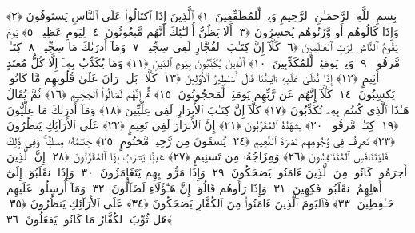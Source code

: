 
  
    
  
    
    

\nopagebreak
  بِسمِ ٱللَّهِ ٱلرَّحمَـٰنِ ٱلرَّحِيمِ
  وَيلٌۭ لِّلمُطَفِّفِينَ ﴿١﴾
 ٱلَّذِينَ إِذَا ٱكتَالُوا۟ عَلَى ٱلنَّاسِ يَستَوفُونَ ﴿٢﴾
 وَإِذَا كَالُوهُم أَو وَّزَنُوهُم يُخسِرُونَ ﴿٣﴾
 أَلَا يَظُنُّ أُو۟لَـٰٓئِكَ أَنَّهُم مَّبعُوثُونَ ﴿٤﴾
 لِيَومٍ عَظِيمٍۢ ﴿٥﴾
 يَومَ يَقُومُ ٱلنَّاسُ لِرَبِّ ٱلعَـٰلَمِينَ ﴿٦﴾
 كَلَّآ إِنَّ كِتَـٰبَ ٱلفُجَّارِ لَفِى سِجِّينٍۢ ﴿٧﴾
 وَمَآ أَدرَىٰكَ مَا سِجِّينٌۭ ﴿٨﴾
 كِتَـٰبٌۭ مَّرقُومٌۭ ﴿٩﴾
 وَيلٌۭ يَومَئِذٍۢ لِّلمُكَذِّبِينَ ﴿١٠﴾
 ٱلَّذِينَ يُكَذِّبُونَ بِيَومِ ٱلدِّينِ ﴿١١﴾
 وَمَا يُكَذِّبُ بِهِۦٓ إِلَّا كُلُّ مُعتَدٍ أَثِيمٍ ﴿١٢﴾
 إِذَا تُتلَىٰ عَلَيهِ ءَايَـٰتُنَا قَالَ أَسَـٰطِيرُ ٱلأَوَّلِينَ ﴿١٣﴾
 كَلَّا ۖ بَل ۜ رَانَ عَلَىٰ قُلُوبِهِم مَّا كَانُوا۟ يَكسِبُونَ ﴿١٤﴾
 كَلَّآ إِنَّهُم عَن رَّبِّهِم يَومَئِذٍۢ لَّمَحجُوبُونَ ﴿١٥﴾
 ثُمَّ إِنَّهُم لَصَالُوا۟ ٱلجَحِيمِ ﴿١٦﴾
 ثُمَّ يُقَالُ هَـٰذَا ٱلَّذِى كُنتُم بِهِۦ تُكَذِّبُونَ ﴿١٧﴾
 كَلَّآ إِنَّ كِتَـٰبَ ٱلأَبرَارِ لَفِى عِلِّيِّينَ ﴿١٨﴾
 وَمَآ أَدرَىٰكَ مَا عِلِّيُّونَ ﴿١٩﴾
 كِتَـٰبٌۭ مَّرقُومٌۭ ﴿٢٠﴾
 يَشهَدُهُ ٱلمُقَرَّبُونَ ﴿٢١﴾
 إِنَّ ٱلأَبرَارَ لَفِى نَعِيمٍ ﴿٢٢﴾
 عَلَى ٱلأَرَآئِكِ يَنظُرُونَ ﴿٢٣﴾
 تَعرِفُ فِى وُجُوهِهِم نَضرَةَ ٱلنَّعِيمِ ﴿٢٤﴾
 يُسقَونَ مِن رَّحِيقٍۢ مَّختُومٍ ﴿٢٥﴾
 خِتَـٰمُهُۥ مِسكٌۭ ۚ وَفِى ذَٟلِكَ فَليَتَنَافَسِ ٱلمُتَنَـٰفِسُونَ ﴿٢٦﴾
 وَمِزَاجُهُۥ مِن تَسنِيمٍ ﴿٢٧﴾
 عَينًۭا يَشرَبُ بِهَا ٱلمُقَرَّبُونَ ﴿٢٨﴾
 إِنَّ ٱلَّذِينَ أَجرَمُوا۟ كَانُوا۟ مِنَ ٱلَّذِينَ ءَامَنُوا۟ يَضحَكُونَ ﴿٢٩﴾
 وَإِذَا مَرُّوا۟ بِهِم يَتَغَامَزُونَ ﴿٣٠﴾
 وَإِذَا ٱنقَلَبُوٓا۟ إِلَىٰٓ أَهلِهِمُ ٱنقَلَبُوا۟ فَكِهِينَ ﴿٣١﴾
 وَإِذَا رَأَوهُم قَالُوٓا۟ إِنَّ هَـٰٓؤُلَآءِ لَضَآلُّونَ ﴿٣٢﴾
 وَمَآ أُرسِلُوا۟ عَلَيهِم حَـٰفِظِينَ ﴿٣٣﴾
 فَٱليَومَ ٱلَّذِينَ ءَامَنُوا۟ مِنَ ٱلكُفَّارِ يَضحَكُونَ ﴿٣٤﴾
 عَلَى ٱلأَرَآئِكِ يَنظُرُونَ ﴿٣٥﴾
 هَل ثُوِّبَ ٱلكُفَّارُ مَا كَانُوا۟ يَفعَلُونَ ﴿٣٦﴾
 
